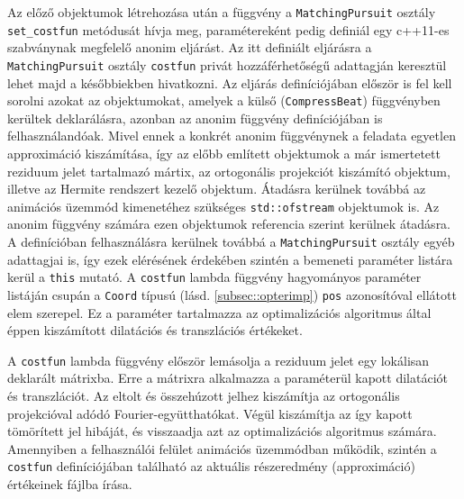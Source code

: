 \documentclass[oneside,titlepage,12pt,a4paper]{report}
\begin{document}
\par Az előző objektumok létrehozása után a függvény a \texttt{MatchingPursuit} osztály \texttt{set\_costfun} metódusát hívja meg, paramétereként pedig definiál egy c++11-es szabványnak megfelelő anonim eljárást. Az itt definiált eljárásra a \texttt{MatchingPursuit} osztály \texttt{costfun} privát hozzáférhetőségű adattagján keresztül lehet majd a későbbiekben hivatkozni. Az eljárás definíciójában először is fel kell sorolni azokat az objektumokat, amelyek a külső (\texttt{CompressBeat}) függvényben kerültek deklarálásra, azonban az anonim függvény definíciójában is felhasználandóak. Mivel ennek a konkrét anonim függvénynek a feladata egyetlen approximáció kiszámítása, így az előbb említett objektumok a már ismertetett reziduum jelet tartalmazó mártix, az ortogonális projekciót kiszámító objektum, illetve az Hermite rendszert kezelő objektum. Átadásra kerülnek továbbá az animációs üzemmód kimenetéhez szükséges \texttt{std::ofstream} objektumok is. Az anonim függvény számára ezen objektumok referencia szerint kerülnek átadásra. A definícióban felhasználásra kerülnek továbbá a \texttt{MatchingPursuit} osztály egyéb adattagjai is, így ezek elérésének érdekében szintén a bemeneti paraméter listára kerül a \texttt{this} mutató. A \texttt{costfun} lambda függvény hagyományos paraméter listáján csupán a \texttt{Coord} típusú (lásd. \ref{subsec::opterimp}) \texttt{pos} azonosítóval ellátott elem szerepel. Ez a paraméter tartalmazza az optimalizációs algoritmus által éppen kiszámított dilatációs és transzlációs értékeket. 
\par A \texttt{costfun} lambda függvény először lemásolja a reziduum jelet egy lokálisan deklarált mátrixba. Erre a mátrixra alkalmazza a paraméterül kapott dilatációt és transzlációt. Az eltolt és összehúzott jelhez kiszámítja az ortogonális projekcióval adódó Fourier-együtthatókat. Végül kiszámítja az így kapott tömörített jel hibáját, és visszaadja azt az optimalizációs algoritmus számára. Amennyiben a felhasználói felület animációs üzemmódban működik, szintén a \texttt{costfun} definíciójában található az aktuális részeredmény (approximáció) értékeinek fájlba írása. 
\end{document}
